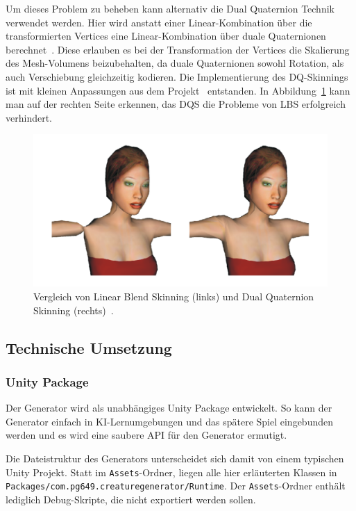 Um dieses Problem zu beheben kann alternativ die Dual Quaternion Technik verwendet werden. Hier wird anstatt einer Linear-Kombination über die transformierten Vertices eine Linear-Kombination über duale Quaternionen berechnet~\cite{dqs}. Diese erlauben es bei der Transformation der Vertices die Skalierung des Mesh-Volumens beizubehalten, da duale Quaternionen sowohl Rotation, als auch Verschiebung gleichzeitig kodieren. Die Implementierung des DQ-Skinnings ist mit kleinen Anpassungen aus dem Projekt~\cite{dqs_github} entstanden. In Abbildung~\ref{fig:dqs} kann man auf der rechten Seite erkennen, das DQS die Probleme von LBS erfolgreich verhindert.

\begin{figure}[h!]
	\centering
	\includegraphics[width=0.7\linewidth]{resources/img/dqs.png}
	\caption{Vergleich von Linear Blend Skinning (links) und Dual Quaternion Skinning (rechts)~\cite{dqs}.}
	\label{fig:dqs}
\end{figure}






\subsection{Technische Umsetzung}

\subsubsection{Unity Package}
Der Generator wird als unabhängiges Unity Package entwickelt.
So kann der Generator einfach in KI-Lernumgebungen und das spätere Spiel eingebunden werden und es wird eine saubere API für den Generator ermutigt.

Die Dateistruktur des Generators unterscheidet sich damit von einem typischen Unity Projekt. Statt im \texttt{Assets}-Ordner, liegen alle hier erläuterten Klassen in \linebreak\texttt{Packages/com.pg649.creaturegenerator/Runtime}.
Der \texttt{Assets}-Ordner enthält lediglich Debug-Skripte, die nicht exportiert werden sollen.

